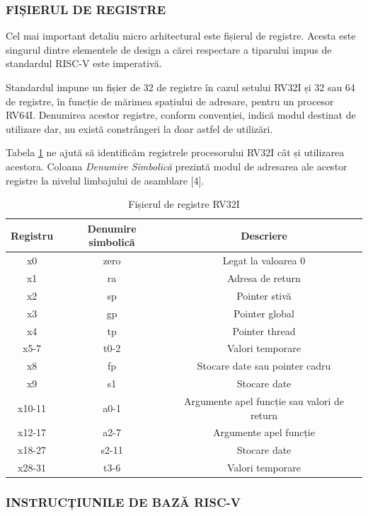\documentclass[12pt]{article}
\begin{document}
\subsubsection{FIȘIERUL DE REGISTRE}
  Cel mai important detaliu micro arhitectural este fișierul de registre. Acesta este singurul dintre elementele de design a cărei respectare a tiparului impus de standardul RISC-V este imperativă.
  
   Standardul impune un fișier de 32 de registre în cazul setului RV32I și 32 sau 64 de registre, în funcție de mărimea spațiului de adresare, pentru un procesor RV64I. Denumirea acestor registre, conform convenției, indică modul destinat de utilizare dar, nu există constrângeri la doar astfel de utilizări.
   
Tabela \ref{Tabela:12} ne ajută să identificăm registrele procesorului RV32I cât și utilizarea acestora. Coloana \textit{Denumire Simbolică} prezintă modul de adresarea ale acestor registre la nivelul limbajului de asamblare [4].

\begin{table}[h]
\centering
\begin{tabular}{ ||c|c|c|| }
 \hline
 Registru & Denumire simbolică & Descriere\\ 
 \hline  \hline
 x0 & zero & Legat la valoarea 0 \\
 \hline
 x1 & ra & Adresa de return \\
 \hline
 x2 & sp & Pointer stivă \\
 \hline 
 x3 & gp & Pointer global \\
  \hline
 x4 & tp & Pointer thread \\
  \hline  
 x5-7 & t0-2 & Valori temporare \\
 \hline
 x8 & fp & Stocare date sau pointer cadru \\
  \hline  
 x9 & s1 & Stocare date \\
  \hline  
 x10-11 & a0-1 & Argumente apel funcție sau valori de return \\
  \hline  
 x12-17 & a2-7 & Argumente apel funcție \\
  \hline  
 x18-27 & s2-11 & Stocare date \\
  \hline  
 x28-31 & t3-6 & Valori temporare \\
  \hline  
\end{tabular}
\caption{Fișierul de registre RV32I}
\label{Tabela:12}
\end{table}

\subsubsection{INSTRUCȚIUNILE DE BAZĂ RISC-V}
\end{document}
